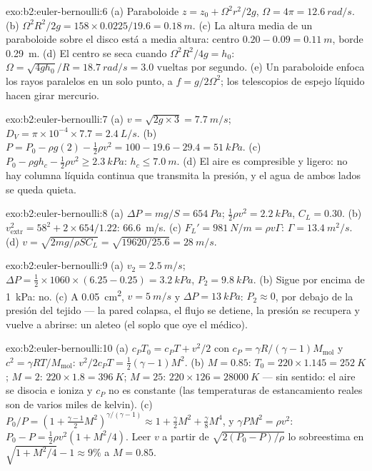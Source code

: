 \begin{solution}{exo:b2:euler-bernoulli:6}
(a) Paraboloide $z = z_0 + \Omega^2r^2/2g$, $\Omega = 4\pi = \qty{12.6}{rad/s}$. (b)
$\Omega^2R^2/2g = 158 \times 0.0225/19.6 = \qty{0.18}{m}$. (c) La altura media de un
paraboloide sobre el disco está a media altura: centro $0.20 - 0.09 = \qty{0.11}{m}$, borde
\qty{0.29}{m}. (d) El centro se seca cuando $\Omega^2R^2/4g = h_0$: $\Omega = \sqrt{4gh_0}/R =
\qty{18.7}{rad/s} = 3.0$ vueltas por segundo. (e) Un paraboloide enfoca los
rayos paralelos en un solo punto, a $f = g/2\Omega^2$; los telescopios de
espejo líquido hacen girar mercurio.
\end{solution}

\begin{solution}{exo:b2:euler-bernoulli:7}
(a) $v = \sqrt{2g \times 3} = \qty{7.7}{m/s}$; $D_V = \pi \times 10^{-4} \times 7.7 =
\qty{2.4}{L/s}$. (b) $P = P_0 - \rho g(2) - \tfrac12\rho v^2 = 100 - 19.6 - 29.4 =
\qty{51}{kPa}$. (c) $P_0 - \rho gh_c - \tfrac12\rho v^2 \ge \qty{2.3}{kPa}$: $h_c \le
\qty{7.0}{m}$. (d) El aire es compresible y ligero: no hay columna líquida
continua que transmita la presión, y el agua de ambos lados se queda quieta.
\end{solution}

\begin{solution}{exo:b2:euler-bernoulli:8}
(a) $\Delta P = mg/S = \qty{654}{Pa}$; $\tfrac12\rho v^2 = \qty{2.2}{kPa}$, $C_L = 0.30$.
(b) $v_{\text{extr}}^2 = 58^2 + 2 \times 654/1.22$: \qty{66.6}{m/s}. (c) $F_L' =
\qty{981}{N/m} = \rho v\Gamma$: $\Gamma = \qty{13.4}{m^2/s}$. (d) $v = \sqrt{2mg/
\rho SC_L} = \sqrt{19620/25.6} = \qty{28}{m/s}$.
\end{solution}

\begin{solution}{exo:b2:euler-bernoulli:9}
(a) $v_2 = \qty{2.5}{m/s}$; $\Delta P = \tfrac12 \times 1060 \times (6.25 - 0.25) =
\qty{3.2}{kPa}$, $P_2 = \qty{9.8}{kPa}$. (b) Sigue por encima de \qty{1}{kPa}: no. (c) A
\qty{0.05}{cm^2}, $v = \qty{5}{m/s}$ y $\Delta P = \qty{13}{kPa}$: $P_2 \approx 0$, por debajo
de la presión del tejido --- la pared colapsa, el flujo se detiene, la
presión se recupera y vuelve a abrirse: un aleteo (el soplo que oye el médico).
\end{solution}

\begin{solution}{exo:b2:euler-bernoulli:10}
(a) $c_PT_0 = c_PT + v^2/2$ con $c_P = \gamma R/(\gamma - 1)M_{\text{mol}}$ y
$c^2 = \gamma RT/M_{\text{mol}}$: $v^2/2c_PT = \tfrac12(\gamma - 1)M^2$. (b) $M =
0.85$: $T_0 = 220 \times 1.145 = \qty{252}{K}$; $M = 2$: $220 \times 1.8 = \qty{396}{K}$;
$M = 25$: $220 \times 126 = \qty{28000}{K}$ --- sin sentido: el aire se disocia
e ioniza y $c_P$ no es constante (las temperaturas de estancamiento reales
son de varios miles de kelvin). (c) $P_0/P = (1 + \tfrac{\gamma - 1}2M^2)^{\gamma/(\gamma
- 1)} \approx 1 + \tfrac{\gamma}2M^2 + \tfrac{\gamma}8M^4$, y $\gamma PM^2 = \rho v^2$:
$P_0 - P = \tfrac12\rho v^2(1 + M^2/4)$. Leer $v$ a partir de $\sqrt{2(P_0 - P)/\rho}$
lo sobreestima en $\sqrt{1 + M^2/4} - 1 \approx 9\%$ a $M = 0.85$.
\end{solution}

